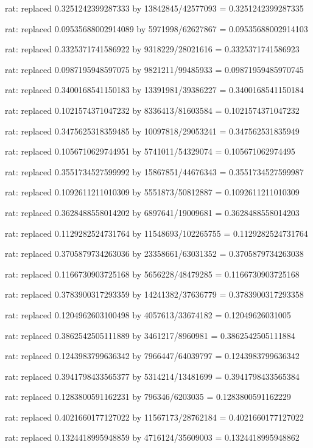 \documentclass[a4paper,10pt]{article}
\begin{document}
\begin{eulernotebook}
\begin{eulercomment}
\begin{eulercomment}
\begin{eulercomment}
\begin{eulercomment}
\begin{eulercomment}
\begin{eulercomment}
\begin{eulercomment}
\begin{eulercomment}
\begin{eulercomment}
\begin{eulercomment}
\begin{eulercomment}
\begin{eulercomment}
\begin{eulercomment}
\begin{eulercomment}
\begin{eulercomment}
\begin{eulercomment}
\begin{euleroutput}
  rat: replaced 0.3251242399287333 by 13842845/42577093 = 0.3251242399287335
  
  rat: replaced 0.09535688002914089 by 5971998/62627867 = 0.09535688002914103
  
  rat: replaced 0.3325371741586922 by 9318229/28021616 = 0.3325371741586923
  
  rat: replaced 0.0987195948597075 by 9821211/99485933 = 0.09871959485970745
  
  rat: replaced 0.3400168541150183 by 13391981/39386227 = 0.3400168541150184
  
  rat: replaced 0.1021574371047232 by 8336413/81603584 = 0.1021574371047232
  
  rat: replaced 0.3475625318359485 by 10097818/29053241 = 0.347562531835949
  
  rat: replaced 0.1056710629744951 by 5741011/54329074 = 0.105671062974495
  
  rat: replaced 0.3551734527599992 by 15867851/44676343 = 0.3551734527599987
  
  rat: replaced 0.1092611211010309 by 5551873/50812887 = 0.1092611211010309
  
  rat: replaced 0.3628488558014202 by 6897641/19009681 = 0.3628488558014203
  
  rat: replaced 0.1129282524731764 by 11548693/102265755 = 0.1129282524731764
  
  rat: replaced 0.3705879734263036 by 23358661/63031352 = 0.3705879734263038
  
  rat: replaced 0.1166730903725168 by 5656228/48479285 = 0.1166730903725168
  
  rat: replaced 0.3783900317293359 by 14241382/37636779 = 0.3783900317293358
  
  rat: replaced 0.1204962603100498 by 4057613/33674182 = 0.12049626031005
  
  rat: replaced 0.3862542505111889 by 3461217/8960981 = 0.3862542505111884
  
  rat: replaced 0.1243983799636342 by 7966447/64039797 = 0.1243983799636342
  
  rat: replaced 0.3941798433565377 by 5314214/13481699 = 0.3941798433565384
  
  rat: replaced 0.1283800591162231 by 796346/6203035 = 0.1283800591162229
  
  rat: replaced 0.4021660177127022 by 11567173/28762184 = 0.4021660177127022
  
  rat: replaced 0.1324418995948859 by 4716124/35609003 = 0.1324418995948862
  

\end{euleroutput}
\end{eulercomment}
\end{eulercomment}
\end{eulercomment}
\end{eulercomment}
\end{eulercomment}
\end{eulercomment}
\end{eulercomment}
\end{eulercomment}
\end{eulercomment}
\end{eulercomment}
\end{eulercomment}
\end{eulercomment}
\end{eulercomment}
\end{eulercomment}
\end{eulercomment}
\end{eulercomment}
\end{eulernotebook}
\end{document}
